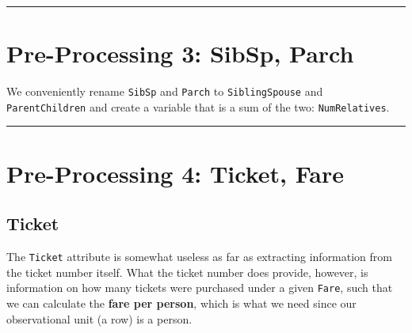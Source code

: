 \documentclass[]{article}
\newenvironment{Shaded}{\begin{snugshade}}{\end{snugshade}}
\newcommand{\KeywordTok}[1]{\textcolor[rgb]{0.13,0.29,0.53}{\textbf{#1}}}
\newcommand{\StringTok}[1]{\textcolor[rgb]{0.31,0.60,0.02}{#1}}
\newcommand{\CommentTok}[1]{\textcolor[rgb]{0.56,0.35,0.01}{\textit{#1}}}
\newcommand{\OtherTok}[1]{\textcolor[rgb]{0.56,0.35,0.01}{#1}}
\newcommand{\OperatorTok}[1]{\textcolor[rgb]{0.81,0.36,0.00}{\textbf{#1}}}
\newcommand{\NormalTok}[1]{#1}
\begin{document}
\begin{center}\rule{0.5\linewidth}{\linethickness}\end{center}

\section{Pre-Processing 3: SibSp,
Parch}\label{pre-processing-3-sibsp-parch}

We conveniently rename \texttt{SibSp} and \texttt{Parch} to
\texttt{SiblingSpouse} and \texttt{ParentChildren} and create a variable
that is a sum of the two: \texttt{NumRelatives}.

\begin{Shaded}
\end{Shaded}

\begin{center}\rule{0.5\linewidth}{\linethickness}\end{center}

\section{Pre-Processing 4: Ticket,
Fare}\label{pre-processing-4-ticket-fare}

\subsection{Ticket}\label{ticket}

The \texttt{Ticket} attribute is somewhat useless as far as extracting
information from the ticket number itself. What the ticket number does
provide, however, is information on how many tickets were purchased
under a given \texttt{Fare}, such that we can calculate the \textbf{fare
per person}, which is what we need since our observational unit (a row)
is a person.
\end{document}

